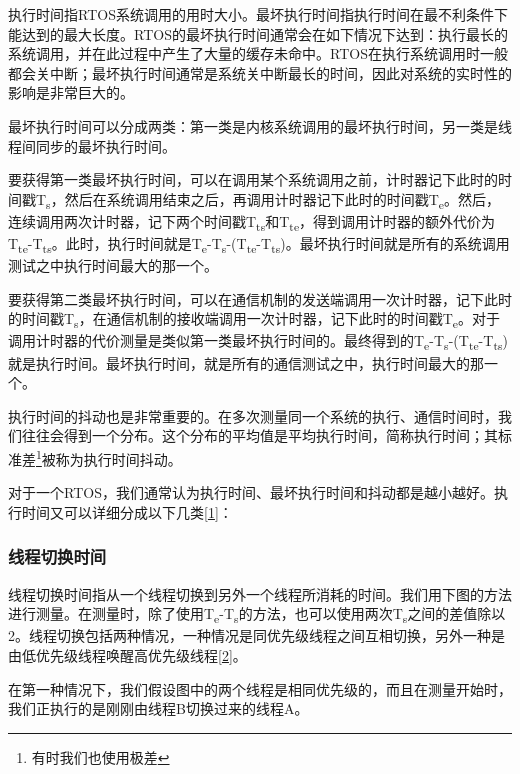执行时间指RTOS系统调用的用时大小。最坏执行时间指执行时间在最不利条件下能达到的最大长度。RTOS的最坏执行时间通常会在如下情况下达到：执行最长的系统调用，并在此过程中产生了大量的缓存未命中。RTOS在执行系统调用时一般都会关中断；最坏执行时间通常是系统关中断最长的时间，因此对系统的实时性的影响是非常巨大的。

最坏执行时间可以分成两类：第一类是内核系统调用的最坏执行时间，另一类是线程间同步的最坏执行时间。

要获得第一类最坏执行时间，可以在调用某个系统调用之前，计时器记下此时的时间戳T\textsubscript{s}，然后在系统调用结束之后，再调用计时器记下此时的时间戳T\textsubscript{e}。然后，连续调用两次计时器，记下两个时间戳T\textsubscript{ts}和T\textsubscript{te}，得到调用计时器的额外代价为T\textsubscript{te}-T\textsubscript{ts}。此时，执行时间就是T\textsubscript{e}-T\textsubscript{s}-(T\textsubscript{te}-T\textsubscript{ts})。最坏执行时间就是所有的系统调用测试之中执行时间最大的那一个。

要获得第二类最坏执行时间，可以在通信机制的发送端调用一次计时器，记下此时的时间戳T\textsubscript{s}，在通信机制的接收端调用一次计时器，记下此时的时间戳T\textsubscript{e}。对于调用计时器的代价测量是类似第一类最坏执行时间的。最终得到的T\textsubscript{e}-T\textsubscript{s}-(T\textsubscript{te}-T\textsubscript{ts})就是执行时间。最坏执行时间，就是所有的通信测试之中，执行时间最大的那一个。

执行时间的抖动也是非常重要的。在多次测量同一个系统的执行、通信时间时，我们往往会得到一个分布。这个分布的平均值是平均执行时间，简称执行时间；其标准差\footnote{有时我们也使用极差}被称为执行时间抖动。

对于一个RTOS，我们通常认为执行时间、最坏执行时间和抖动都是越小越好。执行时间又可以详细分成以下几类\hyperref[sec:chapter-bibliography-2]{{[}1{]}}：

\subsubsection{线程切换时间}\label{subsubsec:thread-switch-time}

线程切换时间指从一个线程切换到另外一个线程所消耗的时间。我们用下图的方法进行测量。在测量时，除了使用T\textsubscript{e}-T\textsubscript{s}的方法，也可以使用两次T\textsubscript{s}之间的差值除以2。线程切换包括两种情况，一种情况是同优先级线程之间互相切换，另外一种是由低优先级线程唤醒高优先级线程\hyperref[sec:chapter-bibliography-2]{{[}2{]}}。

在第一种情况下，我们假设图中的两个线程是相同优先级的，而且在测量开始时，我们正执行的是刚刚由线程B切换过来的线程A。

